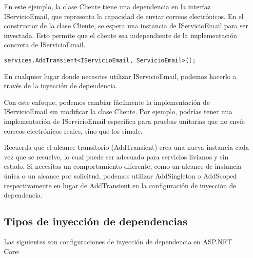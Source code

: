 \documentclass[executivepaper]{article}
\begin{document}
En este ejemplo, la clase Cliente tiene una dependencia en la interfaz IServicioEmail, que representa la capacidad de enviar correos electrónicos. En el constructor de la clase Cliente, se espera una instancia de IServicioEmail para ser inyectada. Esto permite que el cliente sea independiente de la implementación concreta de IServicioEmail.

\begin{lstlisting}
services.AddTransient<IServicioEmail, ServicioEmail>();
\end{lstlisting}

En cualquier lugar donde necesites utilizar IServicioEmail, podemos hacerlo a través de la inyección de dependencia.

Con este enfoque, podemos cambiar fácilmente la implementación de IServicioEmail sin modificar la clase Cliente. Por ejemplo, podrías tener una implementación de IServicioEmail específica para pruebas unitarias que no envíe correos electrónicos reales, sino que los simule.

Recuerda que el alcance transitorio (AddTransient) crea una nueva instancia cada vez que se resuelve, lo cual puede ser adecuado para servicios livianos y sin estado. Si necesitas un comportamiento diferente, como un alcance de instancia única o un alcance por solicitud, podemos utilizar AddSingleton o AddScoped respectivamente en lugar de AddTransient en la configuración de inyección de dependencia.

\subsection*{Tipos de inyección de dependencias}

Las siguientes son configuraciones de inyección de dependencia en ASP.NET Core:
\end{document}
